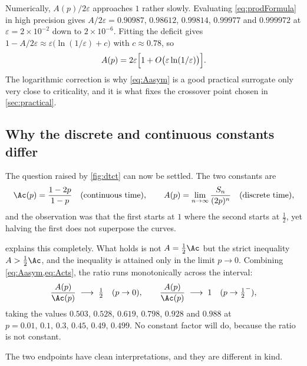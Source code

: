 \begin{remark}
\label{rem:rate}
Numerically, $A(p)/2\varepsilon$ approaches $1$ rather slowly. Evaluating
\cref{eq:prodFormula} in high precision gives $A/2\varepsilon = 0.90987$,
$0.98612$, $0.99814$, $0.99977$ and $0.999972$ at $\varepsilon=2\times10^{-2}$ down
to $2\times10^{-6}$. Fitting the deficit gives
$1-A/2\varepsilon\approx\varepsilon\bigl(\ln(1/\varepsilon)+c\bigr)$ with
$c\approx0.78$, so
\begin{equation*}
A(p) = 2\varepsilon\Bigl[1+O\bigl(\varepsilon\ln(1/\varepsilon)\bigr)\Bigr] .
\end{equation*}
The logarithmic correction is why \cref{eq:Aasym} is a good practical surrogate
only very close to criticality, and it is what fixes the crossover point chosen in
\cref{sec:practical}.
\end{remark}

\subsection{Why the discrete and continuous constants differ}
\label{sec:compare}

The question raised by \cref{fig:dtct} can now be settled. The two constants are
\begin{equation*}
\Ac(p) = \frac{1-2p}{1-p}\quad\text{(continuous time)},
\qquad
A(p) = \lim_{n\to\infty}\frac{S_n}{(2p)^n}\quad\text{(discrete time)},
\end{equation*}
and the observation was that the first starts at $1$ where the second starts at
$\tfrac12$, yet halving the first does not superpose the curves.

 explains this completely. What holds is not
$A=\tfrac12\Ac$ but the strict inequality $A>\tfrac12\Ac$, and the inequality is
attained only in the limit $p\to0$. Combining \cref{eq:Aasym,eq:Acts}, the ratio
runs monotonically across the interval:
\begin{equation}
\label{eq:ratiolimits}
\frac{A(p)}{\Ac(p)} \;\longrightarrow\; \tfrac12 \quad(p\to0),
\qquad
\frac{A(p)}{\Ac(p)} \;\longrightarrow\; 1 \quad(p\to\tfrac12^-),
\end{equation}
taking the values $0.503$, $0.528$, $0.619$, $0.798$, $0.928$ and $0.988$ at
$p=0.01,\,0.1,\,0.3,\,0.45,\,0.49,\,0.499$. No constant factor will do, because the
ratio is not constant.

The two endpoints have clean interpretations, and they are different in kind.

